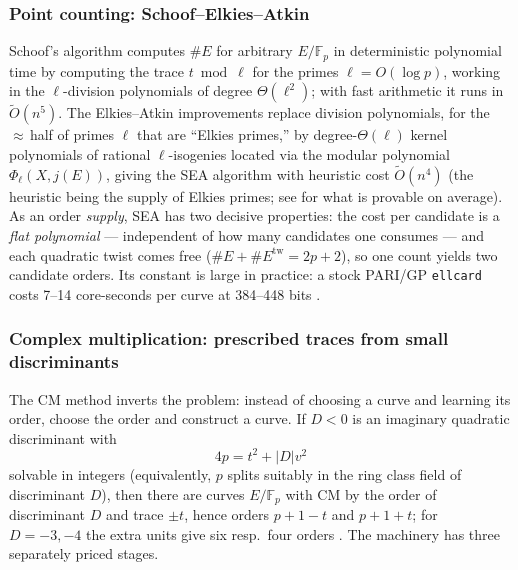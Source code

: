 \documentclass[11pt]{amsart}
\newcommand{\F}{\mathbb{F}}
\newcommand{\Ot}{\widetilde{O}}
\newcommand{\osf}{\cite{OSF}}
\theoremstyle{plain}
\theoremstyle{definition}
\theoremstyle{remark}
\begin{document}
\subsubsection{Point counting: Schoof--Elkies--Atkin}\label{sec:seaengine}
Schoof's algorithm \cite{Scho85} computes $\#E$ for arbitrary $E/\F_p$ in deterministic polynomial time
by computing the trace $t \bmod \ell$ for the primes $\ell = O(\log p)$, working in the $\ell$-division
polynomials of degree $\Theta(\ell^2)$; with fast arithmetic it runs in $\Ot(n^5)$.  The Elkies--Atkin
improvements \cite{Scho95,Elk98} replace division polynomials, for the ${\approx}\,$half of primes
$\ell$ that are ``Elkies primes,'' by degree-$\Theta(\ell)$ kernel polynomials of rational
$\ell$-isogenies located via the modular polynomial $\Phi_\ell(X, j(E))$, giving the SEA algorithm with
heuristic cost $\Ot(n^4)$ (the heuristic being the supply of Elkies primes; see \cite{SS14} for what is
provable on average).  As an order \emph{supply}, SEA has two decisive properties: the cost per
candidate is a \emph{flat polynomial} --- independent of how many candidates one consumes --- and each
quadratic twist comes free ($\#E + \#E^{\mathrm{tw}} = 2p+2$), so one count yields two candidate orders.
Its constant is large in practice: a stock PARI/GP \texttt{ellcard} costs 7--14 core-seconds per curve
at 384--448 bits \osf.

\subsubsection{Complex multiplication: prescribed traces from small discriminants}\label{sec:cmengine}
The CM method inverts the problem: instead of choosing a curve and learning its order, choose the order
and construct a curve.  If $D < 0$ is an imaginary quadratic discriminant with
\[
  4p = t^2 + |D|v^2
\]
solvable in integers (equivalently, $p$ splits suitably in the ring class field of discriminant $D$),
then there are curves $E/\F_p$ with CM by the order of discriminant $D$ and trace $\pm t$, hence orders
$p+1-t$ and $p+1+t$; for $D = -3, -4$ the extra units give six resp.\ four orders \cite{AM93,Cox13}.
The machinery has three separately priced stages.
\end{document}
